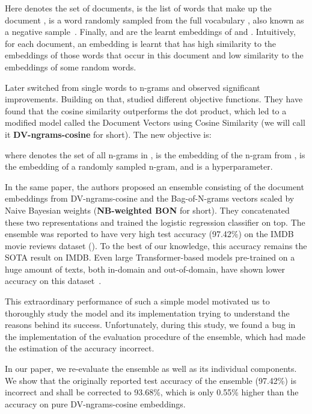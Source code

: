 \documentclass[11pt]{article}
\begin{document}
Here  denotes the set of documents,  is the list of words that make up the document ,  is a word randomly sampled from the full vocabulary , also known as a negative sample~\citep{Goldberg_2014}. Finally,  and  are the learnt embeddings of  and . Intuitively, for each document, an embedding is learnt that has high similarity to the embeddings of those words that occur in this document and low similarity to the embeddings of some random words.

Later \citet{li_2016} switched from single words to n-grams and observed significant improvements. Building on that, \citet{thongtan-phienthrakul-2019-sentiment} studied different objective functions. They have found that the cosine similarity outperforms the dot product, which led to a modified model called the Document Vectors using Cosine Similarity (we will call it \textbf{DV-ngrams-cosine} for short). The new objective is:

where  denotes the set of all n-grams in ,  is the embedding of the n-gram  from ,  is the embedding of a randomly sampled n-gram, and  is a hyperparameter.


In the same paper, the authors proposed an ensemble consisting of the document embeddings from DV-ngrams-cosine and the Bag-of-N-grams vectors scaled by Naive Bayesian weights (\textbf{NB-weighted BON} for short). They concatenated these two representations and trained the logistic regression classifier on top. The ensemble was reported to have very high test accuracy (97.42\%) on the IMDB movie reviews dataset (\citet{maas-etal-2011-learning}). To the best of our knowledge, this accuracy remains the SOTA result on IMDB. Even large Transformer-based models pre-trained on a huge amount of texts, both in-domain and out-of-domain, have shown lower accuracy on this dataset~\cite{yang2019xlnet,suchin2020,arefyev2021nb-mlm}.

This extraordinary performance of such a simple model motivated us to thoroughly study the model and its implementation trying to understand the reasons behind its success. Unfortunately, during this study, we found a bug in the implementation of the evaluation procedure of the ensemble, which had made the estimation of the accuracy incorrect.

In our paper, we re-evaluate the ensemble as well as its individual components. We
show that the originally reported test accuracy of the ensemble (97.42\%) is incorrect and shall be corrected to 93.68\%, which is only 0.55\% higher than the accuracy on pure DV-ngrams-cosine embeddings. 
\end{document}
